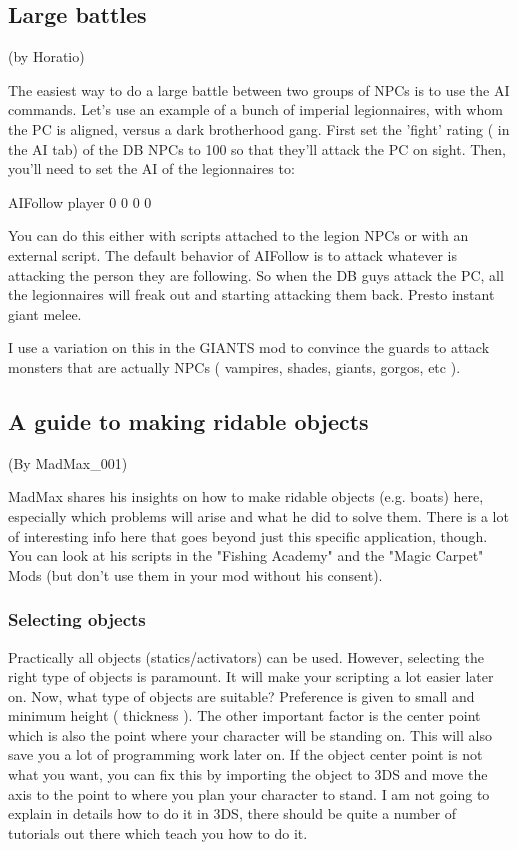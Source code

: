 \hypertarget{large-battles}{%
\subsection{Large battles}\label{large-battles}}

(by Horatio)

The easiest way to do a large battle between two groups of NPCs is to
use the AI commands. Let's use an example of a bunch of imperial
legionnaires, with whom the PC is aligned, versus a dark brotherhood
gang. First set the 'fight' rating ( in the AI tab) of the DB NPCs to
100 so that they'll attack the PC on sight. Then, you'll need to set the
AI of the legionnaires to:

AIFollow player 0 0 0 0

You can do this either with scripts attached to the legion NPCs or with
an external script. The default behavior of AIFollow is to attack
whatever is attacking the person they are following. So when the DB guys
attack the PC, all the legionnaires will freak out and starting
attacking them back. Presto instant giant melee.

I use a variation on this in the GIANTS mod to convince the guards to
attack monsters that are actually NPCs ( vampires, shades, giants,
gorgos, etc ).

\hypertarget{a-guide-to-making-ridable-objects}{%
\subsection{\texorpdfstring{\hfill\break
A guide to making ridable
objects}{ A guide to making ridable objects}}\label{a-guide-to-making-ridable-objects}}

(By MadMax\_001)

MadMax shares his insights on how to make ridable objects (e.g. boats)
here, especially which problems will arise and what he did to solve
them. There is a lot of interesting info here that goes beyond just this
specific application, though. You can look at his scripts in the
"Fishing Academy" and the "Magic Carpet" Mods (but don't use them in
your mod without his consent).

\hypertarget{selecting-objects}{%
\subsubsection{\texorpdfstring{Selecting objects
}{Selecting objects }}\label{selecting-objects}}

Practically all objects (statics/activators) can be used. However,
selecting the right type of objects is paramount. It will make your
scripting a lot easier later on. Now, what type of objects are suitable?
Preference is given to small and minimum height ( thickness ). The other
important factor is the center point which is also the point where your
character will be standing on. This will also save you a lot of
programming work later on. If the object center point is not what you
want, you can fix this by importing the object to 3DS and move the axis
to the point to where you plan your character to stand. I am not going
to explain in details how to do it in 3DS, there should be quite a
number of tutorials out there which teach you how to do it.

